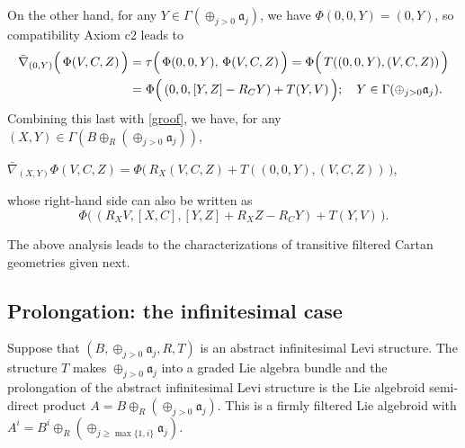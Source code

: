 \documentclass[leqno,12pt]{amsart} %
\begin{document}
On the other hand, for any $Y \in \Gamma(\oplus_{j>0}{\mathfrak a}_j)$, we have
$\Phi(0,0,Y)=(0,Y)$, so compatibility Axiom c2 leads to
\begin{align}
  \bar\nabla_{(0, Y)} \Big(\,\Phi(V, C, Z)\,\Big)
  &=\tau\Big(\,\Phi(0, 0, Y),\,\Phi(V, C, Z)\,\Big) =
    \Phi\Big(\,T((0, 0, Y), (V, C, Z))\,\Big)\label{cab0}\\
  &=\Phi\Big(\,(0,0,[Y,Z] - R_CY) + T(Y, V)\,\Big);
    \quad Y \in \Gamma(\oplus_{j>0}{\mathfrak a}_j).\notag
\end{align}
Combining this last with \eqref{groof}, we have, for any
$(X, Y) \in \Gamma(B \oplus_R(\oplus_{j>0} {\mathfrak a}_j))$,
\begin{conditions}\item[{\bfseries S3.}]
  \quad $\bar\nabla_{(X,Y)}\Phi(V, C, Z)
  =\Phi\Big(\,R_X(V, C, Z) + T((0, 0, Y), (V, C, Z))\,\Big)$,
\end{conditions}
whose right-hand side can also be written as
$$\Phi\Big(\,(R_XV, [X,C], [Y,Z] +R_XZ - R_CY) + T(Y, V)\,\Big).$$

The above analysis leads to the characterizations of transitive filtered Cartan geometries
given next.

\subsection{Prolongation: the infinitesimal case}\label{inflevi_}
Suppose that $(B, \oplus_{j>0}{\mathfrak a}_j, R, T)$ is an abstract infinitesimal Levi
structure. The structure $T$ makes $\oplus_{j>0}{\mathfrak a}_j$ into a graded Lie algebra
bundle and the {\df prolongation} of the abstract infinitesimal Levi structure is
the Lie algebroid semi-direct product $A = B \oplus_R(\oplus_{j>0}{\mathfrak a}_j)$. This
is a firmly filtered Lie algebroid with
$A^i = B^i \oplus_R(\oplus_{j\ge\max\{1,i\}}{\mathfrak a}_j)$.
\end{document}
